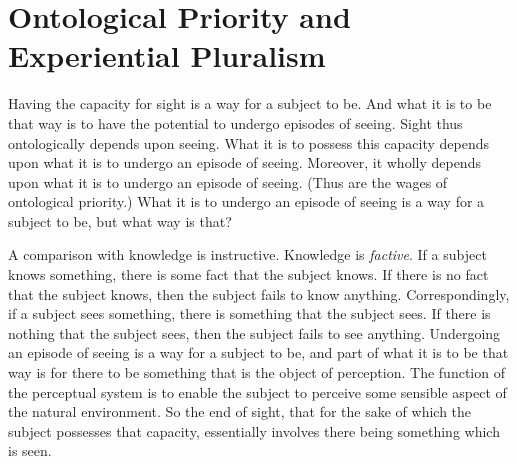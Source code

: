 \documentclass[12pt]{article}
\begin{document}

\section{Ontological Priority and Experiential Pluralism} %
\label{sec:ontological_priority_and_experiential_pluralism}

Having the capacity for sight is a way for a subject to be. And what it is to be that way is to have the potential to undergo episodes of seeing. Sight thus ontologically depends upon seeing. What it is to possess this capacity depends upon what it is to undergo an episode of seeing. Moreover, it wholly depends upon what it is to undergo an episode of seeing. (Thus are the wages of ontological priority.) What it is to undergo an episode of seeing is a way for a subject to be, but what way is that?

A comparison with knowledge is instructive. Knowledge is \emph{factive}. If a subject knows something, there is some fact that the subject knows. If there is no fact that the subject knows, then the subject fails to know anything. Correspondingly, if a subject sees something, there is something that the subject sees. If there is nothing that the subject sees, then the subject fails to see anything. Undergoing an episode of seeing is a way for a subject to be, and part of what it is to be that way is for there to be something that is the object of perception. The function of the perceptual system is to enable the subject to perceive some sensible aspect of the natural environment. So the end of sight, that for the sake of which the subject possesses that capacity, essentially involves there being something which is seen.
\end{document}
